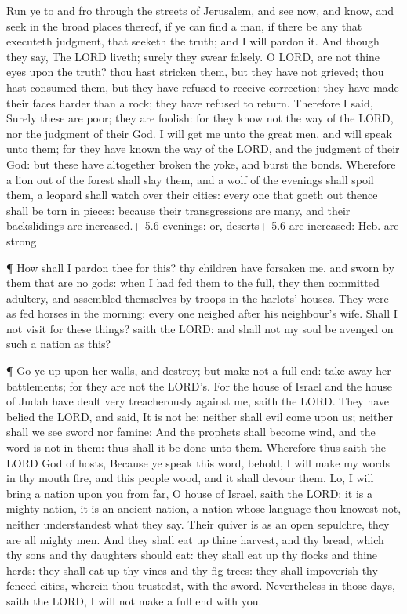  Run ye to and fro through the streets of Jerusalem, and see
now, and know, and seek in the broad places thereof, if ye can find a
man, if there be any that executeth judgment, that seeketh the truth;
and I will pardon it.  And though they say, The LORD liveth;
surely they swear falsely.  O LORD, are not thine eyes upon
the truth? thou hast stricken them, but they have not grieved; thou hast
consumed them, but they have refused to receive correction: they have
made their faces harder than a rock; they have refused to return.
 Therefore I said, Surely these are poor; they are foolish:
for they know not the way of the LORD, nor the judgment of their God.
 I will get me unto the great men, and will speak unto them;
for they have known the way of the LORD, and the judgment of their God:
but these have altogether broken the yoke, and burst the bonds.
 Wherefore a lion out of the forest shall slay them, and a
wolf of the evenings shall spoil them, a leopard shall watch over their
cities: every one that goeth out thence shall be torn in pieces: because
their transgressions are many, and their backslidings are increased.+
5.6 evenings: or, deserts+ 5.6 are increased: Heb. are strong

 ¶ How shall I pardon thee for this? thy children have
forsaken me, and sworn by them that are no gods: when I had fed them to
the full, they then committed adultery, and assembled themselves by
troops in the harlots' houses.  They were as fed horses in
the morning: every one neighed after his neighbour's wife. 
Shall I not visit for these things? saith the LORD: and shall not my
soul be avenged on such a nation as this?

 ¶ Go ye up upon her walls, and destroy; but make not a
full end: take away her battlements; for they are not the LORD's.
 For the house of Israel and the house of Judah have dealt
very treacherously against me, saith the LORD.  They have
belied the LORD, and said, It is not he; neither shall evil come upon
us; neither shall we see sword nor famine:  And the
prophets shall become wind, and the word is not in them: thus shall it
be done unto them.  Wherefore thus saith the LORD God of
hosts, Because ye speak this word, behold, I will make my words in thy
mouth fire, and this people wood, and it shall devour them.
 Lo, I will bring a nation upon you from far, O house of
Israel, saith the LORD: it is a mighty nation, it is an ancient nation,
a nation whose language thou knowest not, neither understandest what
they say.  Their quiver is as an open sepulchre, they are
all mighty men.  And they shall eat up thine harvest, and
thy bread, which thy sons and thy daughters should eat: they shall eat
up thy flocks and thine herds: they shall eat up thy vines and thy fig
trees: they shall impoverish thy fenced cities, wherein thou trustedst,
with the sword.  Nevertheless in those days, saith the
LORD, I will not make a full end with you.

